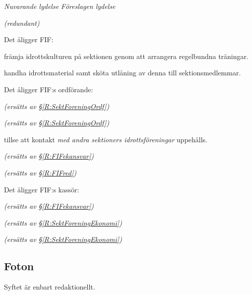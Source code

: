 \documentclass{article}
\newenvironment{lydelse}
    {\begin{paracol}{2}%
        \emph{Nuvarande lydelse}%
        \switchcolumn%
        \emph{Föreslagen lydelse}%
    \end{paracol}%
    \begin{enumerate}[label=\thesubsection.\arabic*]%
    \begin{paracol}{2}%
    }{\end{paracol}\end{enumerate}}
\begin{document}
\begin{lydelse}
    \item[] \emph{(redundant)}\vspace{6em}
    
    \item Det åligger FIF:
    \begin{aligganden}
        \item främja idrottskulturen på sektionen genom att arrangera regelbundna träningar.
        \item handha idrottsmaterial samt sköta utlåning av denna till sektionsmedlemmar.
    \end{aligganden}
    
    \item Det åligger FIF:s ordförande:\vspace{-0.4em}
    \begin{aligganden}
        \item[] \emph{(ersätts av \S \ref{R:SektForeningOrdf})}
        \item[] \emph{(ersätts av \S \ref{R:SektForeningOrdf})}\vspace{0.4em}    
        \item tillse att kontakt \emph{med andra sektioners idrottsföreningar} uppehålls.\vspace{2.6em}
        \item[] \emph{(ersätts av \S \ref{R:FIFekansvar})}%
        \vspace{1em}
        \item[] \emph{(ersätts av \S \ref{R:FIFred})}%
    \end{aligganden}
    
    \vspace{2.2em}
    \item Det åligger FIF:s kassör:
    \begin{aligganden}
        \item[] \emph{(ersätts av \S \ref{R:FIFekansvar})}\vspace{1.2em}
        \item[] \emph{(ersätts av \S \ref{R:SektForeningEkonomi})}\vspace{1.4em}
        \item[] \emph{(ersätts av \S \ref{R:SektForeningEkonomi})}
    \end{aligganden}
    
\end{lydelse}
\subsection{Foton}
Syftet är enbart redaktionellt.
\end{document}
